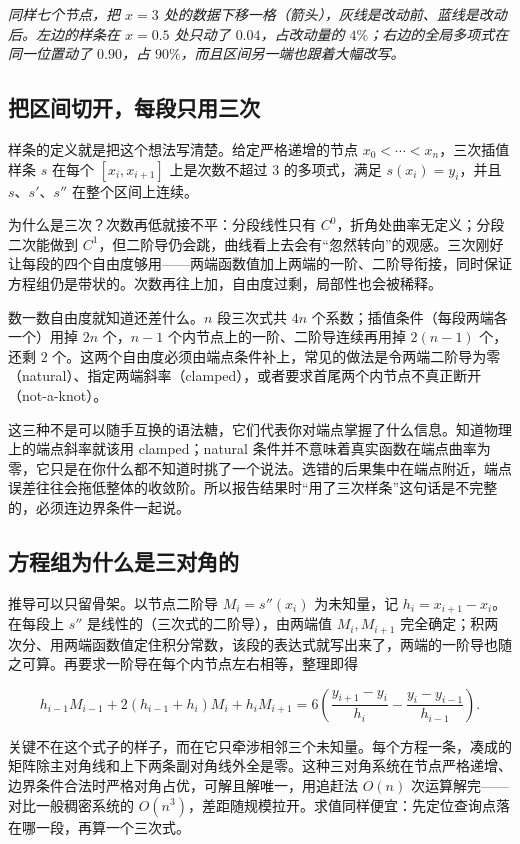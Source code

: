 \begin{center}
\emph{同样七个节点，把 \(x=3\) 处的数据下移一格（箭头），灰线是改动前、蓝线是改动后。左边的样条在 \(x=0.5\) 处只动了 \(0.04\)，占改动量的 \(4\%\)；右边的全局多项式在同一位置动了 \(0.90\)，占 \(90\%\)，而且区间另一端也跟着大幅改写。}
\end{center}

\subsection{把区间切开，每段只用三次}

样条的定义就是把这个想法写清楚。给定严格递增的节点 \(x_0<\cdots<x_n\)，三次插值样条 \(s\) 在每个 \([x_i,x_{i+1}]\) 上是次数不超过 \(3\) 的多项式，满足 \(s(x_i)=y_i\)，并且 \(s\)、\(s'\)、\(s''\) 在整个区间上连续。

为什么是三次？次数再低就接不平：分段线性只有 \(C^0\)，折角处曲率无定义；分段二次能做到 \(C^1\)，但二阶导仍会跳，曲线看上去会有``忽然转向''的观感。三次刚好让每段的四个自由度够用——两端函数值加上两端的一阶、二阶导衔接，同时保证方程组仍是带状的。次数再往上加，自由度过剩，局部性也会被稀释。

数一数自由度就知道还差什么。\(n\) 段三次式共 \(4n\) 个系数；插值条件（每段两端各一个）用掉 \(2n\) 个，\(n-1\) 个内节点上的一阶、二阶导连续再用掉 \(2(n-1)\) 个，还剩 \(2\) 个。这两个自由度必须由端点条件补上，常见的做法是令两端二阶导为零（natural）、指定两端斜率（clamped），或者要求首尾两个内节点不真正断开（not-a-knot）。

这三种不是可以随手互换的语法糖，它们代表你对端点掌握了什么信息。知道物理上的端点斜率就该用 clamped；natural 条件并不意味着真实函数在端点曲率为零，它只是在你什么都不知道时挑了一个说法。选错的后果集中在端点附近，端点误差往往会拖低整体的收敛阶。所以报告结果时``用了三次样条''这句话是不完整的，必须连边界条件一起说。

\subsection{方程组为什么是三对角的}

推导可以只留骨架。以节点二阶导 \(M_i=s''(x_i)\) 为未知量，记 \(h_i=x_{i+1}-x_i\)。在每段上 \(s''\) 是线性的（三次式的二阶导），由两端值 \(M_i,M_{i+1}\) 完全确定；积两次分、用两端函数值定住积分常数，该段的表达式就写出来了，两端的一阶导也随之可算。再要求一阶导在每个内节点左右相等，整理即得

\[
h_{i-1}M_{i-1}+2(h_{i-1}+h_i)M_i+h_iM_{i+1}
=6\left(\frac{y_{i+1}-y_i}{h_i}-\frac{y_i-y_{i-1}}{h_{i-1}}\right).
\]

关键不在这个式子的样子，而在它只牵涉相邻三个未知量。每个方程一条，凑成的矩阵除主对角线和上下两条副对角线外全是零。这种三对角系统在节点严格递增、边界条件合法时严格对角占优，可解且解唯一，用追赶法 \(O(n)\) 次运算解完——对比一般稠密系统的 \(O(n^3)\)，差距随规模拉开。求值同样便宜：先定位查询点落在哪一段，再算一个三次式。

